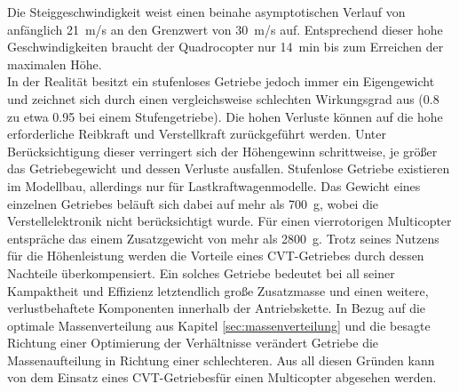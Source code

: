 Die Steiggeschwindigkeit weist einen beinahe asymptotischen Verlauf von anfänglich \SI{21}{m/s} an den Grenzwert von \SI{30}{m/s} auf. Entsprechend dieser hohe Geschwindigkeiten braucht der Quadrocopter nur \SI{14}{min} bis zum Erreichen der maximalen Höhe. \\
In der Realität besitzt ein stufenloses Getriebe jedoch immer ein Eigengewicht und zeichnet sich durch einen vergleichsweise schlechten Wirkungsgrad aus (\SI{0.8}{} zu etwa \SI{0.95}{} bei einem Stufengetriebe)\cite{Fischer.2016}.
Die hohen Verluste können auf die hohe erforderliche Reibkraft und Verstellkraft zurückgeführt werden. Unter Berücksichtigung dieser verringert sich der Höhengewinn schrittweise, je größer das Getriebegewicht und dessen Verluste ausfallen. Stufenlose Getriebe existieren im Modellbau, allerdings nur für Lastkraftwagenmodelle. Das Gewicht eines einzelnen Getriebes beläuft sich dabei auf mehr als \SI{700}{g}, wobei die Verstellelektronik nicht berücksichtigt wurde. Für einen vierrotorigen Multicopter entspräche das einem Zusatzgewicht von mehr als \SI{2800}{g}. 
Trotz seines Nutzens für die Höhenleistung werden die Vorteile eines CVT-Getriebes durch dessen Nachteile überkompensiert. Ein solches Getriebe bedeutet bei all seiner Kampaktheit und Effizienz letztendlich große Zusatzmasse und einen weitere, verlustbehaftete Komponenten innerhalb der Antriebskette. In Bezug auf die optimale Massenverteilung aus Kapitel \ref{sec:massenverteilung} und die besagte Richtung einer Optimierung der Verhältnisse verändert Getriebe die Massenaufteilung in Richtung einer schlechteren. Aus all diesen Gründen kann von dem Einsatz eines CVT-Getriebesfür einen Multicopter abgesehen werden.



